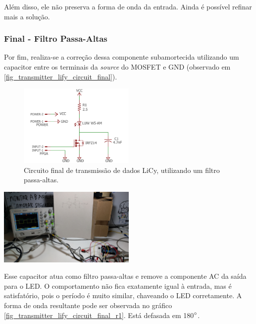 	Além disso, ele não preserva a forma de onda da entrada. Ainda é possível refinar mais a solução.
	
	\subsubsection{Final - Filtro Passa-Altas}
	Por fim, realiza-se a correção dessa componente subamortecida utilizando um capacitor entre os terminais da \textit{source} do MOSFET e GND (observado em \autoref{fig_transmitter_lify_circuit_final}). 
	\begin{figure}[h!]
		\caption{\label{fig_transmitter_lify_circuit_final}Circuito final de transmissão de dados LiCy, utilizando um filtro passa-altas.}
		\centering
		\includegraphics[width=0.5\textwidth, trim={2cm 0cm 2cm 0cm}, clip]{circuits/transmitter_lify.pdf}
	\end{figure}
	
	\begin{chart}[h!]
		\caption{\label{fig_transmitter_lify_circuit_final_r1} Forma de onda após adicionar um capacitor que age como filtro passa-altas. Está defasada em 180$\degree$. }
		\centering
		\includegraphics[width=0.5\textwidth, trim={10cm 35cm 97cm 22cm}, clip]{circuits/photos/TX_200k_with_filter.jpeg}
	\end{chart}
	Esse capacitor atua como filtro passa-altas e remove a componente AC da saída para o LED. O comportamento não fica exatamente igual à entrada, mas é satisfatório, pois o período é muito similar, chaveando o LED corretamente. A forma de onda resultante pode ser observada no gráfico \ref{fig_transmitter_lify_circuit_final_r1}. Está defasada em 180$\degree$.


